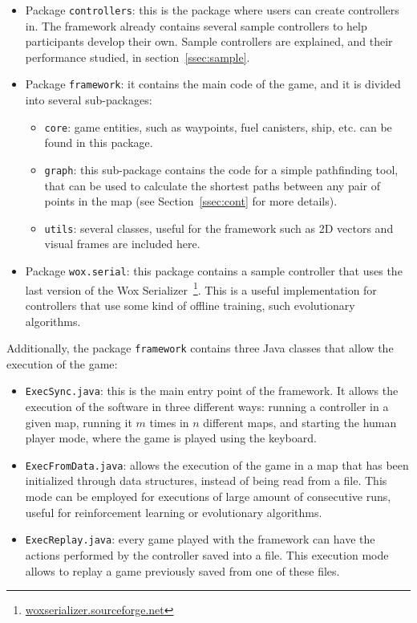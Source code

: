 \documentclass[conference]{IEEEtran}
\newcommand{\code}[1]{{\lstinline!#1!}}
\begin{document}
\begin{itemize}
\item Package \code{controllers}: this is the package where users can create controllers in. The framework already contains several sample controllers to help participants develop their own. Sample controllers are explained, and their performance studied, in section~\ref{ssec:sample}.
\item Package \code{framework}: it contains the main code of the game, and it is divided into several sub-packages:
\begin{itemize}
\item \code{core}: game entities, such as waypoints, fuel canisters, ship, etc. can be found in this package.
\item \code{graph}: this sub-package contains the code for a simple pathfinding tool, that can be used to calculate the shortest paths between any pair of points in the map (see Section~\ref{ssec:cont} for more details).
\item \code{utils}: several classes, useful for the framework such as 2D vectors and visual frames are included here.
\end{itemize}
\item Package \code{wox.serial}: this package contains a sample controller that uses the last version of the Wox Serializer~\footnote{\url{woxserializer.sourceforge.net}}. This is a useful implementation for controllers that use some kind of offline training, such evolutionary algorithms.
\end{itemize}

Additionally, the package \code{framework} contains three Java classes that allow the execution of the game:

\begin{itemize}
\item \code{ExecSync.java}: this is the main entry point of the framework. It allows the execution of the software in three different ways: running a controller in a given map, running it $m$ times in $n$ different maps, and starting the human player mode, where the game is played using the keyboard.
\item \code{ExecFromData.java}: allows the execution of the game in a map that has been initialized through data structures, instead of being read from a file. This mode can be employed for executions of large amount of consecutive runs, useful for reinforcement learning or evolutionary algorithms.
\item \code{ExecReplay.java}: every game played with the framework can have the actions performed by the controller saved into a file. This execution mode allows to replay a game previously saved from one of these files.
\end{itemize}
\end{document}
